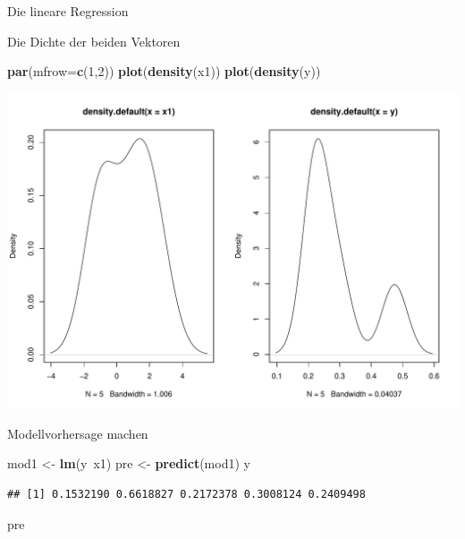 \documentclass[ignorenonframetext,]{beamer}
\newenvironment{Shaded}{}{}
\newcommand{\KeywordTok}[1]{\textcolor[rgb]{0.00,0.44,0.13}{\textbf{{#1}}}}
\newcommand{\DataTypeTok}[1]{\textcolor[rgb]{0.56,0.13,0.00}{{#1}}}
\newcommand{\DecValTok}[1]{\textcolor[rgb]{0.25,0.63,0.44}{{#1}}}
\newcommand{\StringTok}[1]{\textcolor[rgb]{0.25,0.44,0.63}{{#1}}}
\newcommand{\NormalTok}[1]{{#1}}
\begin{document}
\begin{frame}[fragile]{Die lineare Regression}
\begin{block}{Die Dichte der beiden Vektoren}

\begin{Shaded}
\begin{Highlighting}[]
\KeywordTok{par}\NormalTok{(}\DataTypeTok{mfrow=}\KeywordTok{c}\NormalTok{(}\DecValTok{1}\NormalTok{,}\DecValTok{2}\NormalTok{))}
\KeywordTok{plot}\NormalTok{(}\KeywordTok{density}\NormalTok{(x1))}
\KeywordTok{plot}\NormalTok{(}\KeywordTok{density}\NormalTok{(y))}
\end{Highlighting}
\end{Shaded}

\includegraphics{R_intern_files/figure-beamer/unnamed-chunk-298-1.pdf}

\end{block}

\begin{block}{Modellvorhersage machen}

\begin{Shaded}
\begin{Highlighting}[]
\NormalTok{mod1 <-}\StringTok{ }\KeywordTok{lm}\NormalTok{(y~x1)}
\NormalTok{pre <-}\StringTok{ }\KeywordTok{predict}\NormalTok{(mod1)}
\NormalTok{y}
\end{Highlighting}
\end{Shaded}

\begin{verbatim}
## [1] 0.1532190 0.6618827 0.2172378 0.3008124 0.2409498
\end{verbatim}

\begin{Shaded}
\begin{Highlighting}[]
\NormalTok{pre}
\end{Highlighting}
\end{Shaded}


\end{block}
\end{frame}
\end{document}
